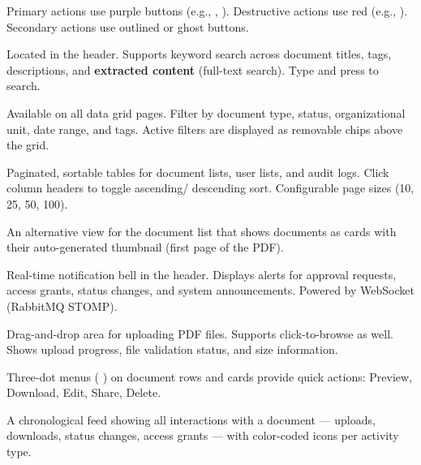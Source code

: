 \begin{description}[leftmargin=18pt, style=nextline]
  \item[\faMousePointer\hspace{4pt}Buttons]
    Primary actions use purple buttons (e.g., ,
    ). Destructive actions use red
    (e.g., ). Secondary actions use outlined
    or ghost buttons.

  \item[\faSearch\hspace{4pt}Search Bar]
    Located in the header. Supports keyword search across
    document titles, tags, descriptions, and \textbf{extracted
    content} (full-text search). Type and press 
    to search.

  \item[\faFilter\hspace{4pt}Filters]
    Available on all data grid pages. Filter by document type,
    status, organizational unit, date range, and tags.
    Active filters are displayed as removable chips above
    the grid.

  \item[\faTable\hspace{4pt}Data Grid]
    Paginated, sortable tables for document lists, user lists,
    and audit logs. Click column headers to toggle ascending/
    descending sort. Configurable page sizes (10, 25, 50, 100).

  \item[\faTh\hspace{4pt}Thumbnail Grid]
    An alternative view for the document list that shows
    documents as cards with their auto-generated thumbnail
    (first page of the PDF).

  \item[\faBell\hspace{4pt}Notifications]
    Real-time notification bell in the header. Displays alerts
    for approval requests, access grants, status changes, and
    system announcements. Powered by WebSocket (RabbitMQ STOMP).

  \item[\faUpload\hspace{4pt}File Dropzone]
    Drag-and-drop area for uploading PDF files. Supports
    click-to-browse as well. Shows upload progress, file
    validation status, and size information.

  \item[\faEllipsisV\hspace{4pt}Context Menus]
    Three-dot menus (\,\faEllipsisV\,) on document rows and
    cards provide quick actions: Preview, Download, Edit,
    Share, Delete.

  \item[\faHistory\hspace{4pt}Activity Timeline]
    A chronological feed showing all interactions with a
    document --- uploads, downloads, status changes, access
    grants --- with color-coded icons per activity type.
\end{description}

